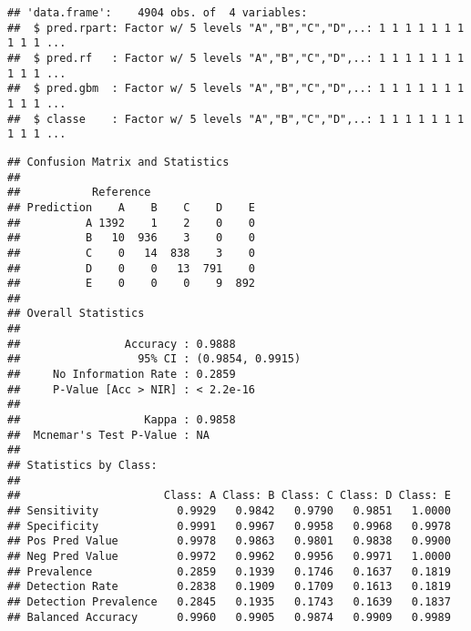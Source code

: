 \documentclass[]{article}
\newenvironment{Shaded}{\begin{snugshade}}{\end{snugshade}}
\newcommand{\KeywordTok}[1]{\textcolor[rgb]{0.13,0.29,0.53}{\textbf{{#1}}}}
\newcommand{\DataTypeTok}[1]{\textcolor[rgb]{0.13,0.29,0.53}{{#1}}}
\newcommand{\StringTok}[1]{\textcolor[rgb]{0.31,0.60,0.02}{{#1}}}
\newcommand{\NormalTok}[1]{{#1}}
\begin{document}
\begin{verbatim}
## 'data.frame':    4904 obs. of  4 variables:
##  $ pred.rpart: Factor w/ 5 levels "A","B","C","D",..: 1 1 1 1 1 1 1 1 1 1 ...
##  $ pred.rf   : Factor w/ 5 levels "A","B","C","D",..: 1 1 1 1 1 1 1 1 1 1 ...
##  $ pred.gbm  : Factor w/ 5 levels "A","B","C","D",..: 1 1 1 1 1 1 1 1 1 1 ...
##  $ classe    : Factor w/ 5 levels "A","B","C","D",..: 1 1 1 1 1 1 1 1 1 1 ...
\end{verbatim}

\begin{Shaded}
\end{Shaded}

\begin{verbatim}
## Confusion Matrix and Statistics
## 
##           Reference
## Prediction    A    B    C    D    E
##          A 1392    1    2    0    0
##          B   10  936    3    0    0
##          C    0   14  838    3    0
##          D    0    0   13  791    0
##          E    0    0    0    9  892
## 
## Overall Statistics
##                                           
##                Accuracy : 0.9888          
##                  95% CI : (0.9854, 0.9915)
##     No Information Rate : 0.2859          
##     P-Value [Acc > NIR] : < 2.2e-16       
##                                           
##                   Kappa : 0.9858          
##  Mcnemar's Test P-Value : NA              
## 
## Statistics by Class:
## 
##                      Class: A Class: B Class: C Class: D Class: E
## Sensitivity            0.9929   0.9842   0.9790   0.9851   1.0000
## Specificity            0.9991   0.9967   0.9958   0.9968   0.9978
## Pos Pred Value         0.9978   0.9863   0.9801   0.9838   0.9900
## Neg Pred Value         0.9972   0.9962   0.9956   0.9971   1.0000
## Prevalence             0.2859   0.1939   0.1746   0.1637   0.1819
## Detection Rate         0.2838   0.1909   0.1709   0.1613   0.1819
## Detection Prevalence   0.2845   0.1935   0.1743   0.1639   0.1837
## Balanced Accuracy      0.9960   0.9905   0.9874   0.9909   0.9989
\end{verbatim}
\end{document}
